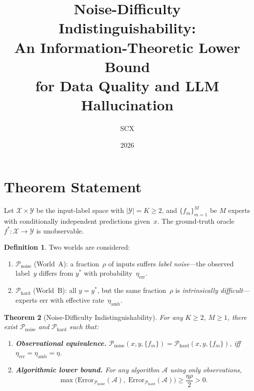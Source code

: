 \documentclass[10pt,a4paper]{article}
\title{\bfseries\large Noise-Difficulty Indistinguishability:\\An Information-Theoretic Lower Bound\\for Data Quality and LLM Hallucination}
\author{SCX}}
\date{2026}
\newtheorem{theorem}{Theorem}[section]
\theoremstyle{definition}
\newtheorem{definition}[theorem]{Definition}
\theoremstyle{remark}
\begin{document}
\maketitle
\thispagestyle{empty}
\vspace{-8mm}

\section{Theorem Statement}

Let $\mathcal{X}\times\mathcal{Y}$ be the input-label space with $|\mathcal{Y}|=K\geq2$,
and $\{f_m\}_{m=1}^M$ be $M$ experts with conditionally independent predictions given~$x$.
The ground-truth oracle $f^*:\mathcal{X}\to\mathcal{Y}$ is unobservable.

\begin{definition}
Two worlds are considered:
\begin{enumerate}[label=(\roman*)]
  \item $\mathcal{P}_{\text{noise}}$ (World~A): a fraction~$\rho$ of inputs suffers
        \emph{label noise}---the observed label~$y$ differs from $y^*$ with probability~$\eta_{\text{err}}$.
  \item $\mathcal{P}_{\text{hard}}$ (World~B): all $y=y^*$, but the same fraction~$\rho$
        is \emph{intrinsically difficult}---experts err with effective rate~$\eta_{\text{amb}}$.
\end{enumerate}
\end{definition}

\begin{theorem}[Noise-Difficulty Indistinguishability]\label{thm:main}
For any $K\geq2$, $M\geq1$, there exist $\mathcal{P}_{\text{noise}}$ and $\mathcal{P}_{\text{hard}}$ such that:
\begin{enumerate}[label=(\arabic*)]
  \item \textbf{Observational equivalence.}
        $\mathcal{P}_{\text{noise}}(x,y,\{f_m\}) = \mathcal{P}_{\text{hard}}(x,y,\{f_m\})$,
        \emph{iff} $\eta_{\text{err}}=\eta_{\text{amb}}=\eta$.
        \label{item:equiv}

  \item \textbf{Algorithmic lower bound.}
        For any algorithm $\mathcal{A}$ using only observations,
        \begin{equation}\label{eq:bound}
        \max\bigl(\mathrm{Error}_{\mathcal{P}_{\text{noise}}}(\mathcal{A}),\;
                   \mathrm{Error}_{\mathcal{P}_{\text{hard}}}(\mathcal{A})\bigr)
        \ge \frac{\eta\rho}{2}>0.
        \end{equation}
        \label{item:bound}
\end{enumerate}
\end{theorem}
\end{document}
